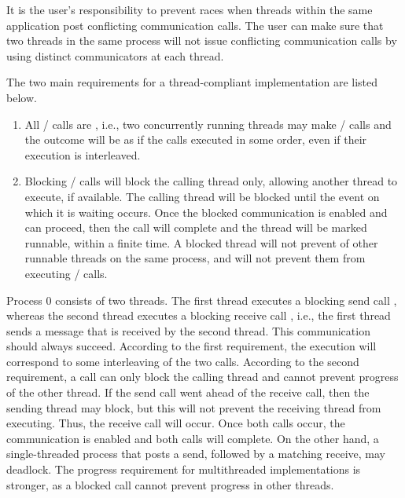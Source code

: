 \begin{users}
It is the user's responsibility to prevent races when threads within the
same application post conflicting communication calls.  The user can
make sure that two threads in the same process will not issue
conflicting communication calls by using distinct communicators at each
thread.
\end{users}

The two main requirements for a thread-compliant implementation are listed
below.
\begin{enumerate}
\item
All \MPI/ calls are
,
i.e.,
two concurrently
running threads may make \MPI/ calls and the outcome will be as if the
calls executed in some order, even if their execution is interleaved.
\item
Blocking \MPI/ calls will block the calling thread only, allowing
another thread to execute, if available.
The calling thread will be blocked until the
event on which it is waiting occurs.  Once the blocked communication is
enabled and can proceed, then the call will complete and the thread
will be marked runnable, within a finite time.
A blocked thread will not prevent 
of other runnable threads
on the same process, and will not prevent them from executing \MPI/
calls.
\end{enumerate}

\begin{example}
Process 0 consists of two threads.  The first thread
executes a blocking send call , whereas the second thread executes a blocking receive
call ,
i.e.,
the first thread sends a message that is
received by the second thread.  This communication should always
succeed.  According to the first requirement, the execution will
correspond to some interleaving of the two calls.  According to the
second requirement, a call can only block the calling thread and
cannot prevent progress of the other thread.  If the send call went
ahead of the receive call, then the sending thread may block, but this
will not prevent the receiving thread from executing.  Thus, the
receive call
will occur.  Once both calls occur, the communication is enabled
and both calls will complete.  On the other hand, a
single-threaded process that posts a send, followed by a matching
receive, may deadlock.  The progress requirement for multithreaded
implementations is stronger, as a blocked call cannot prevent progress
in other threads.
\end{example}

